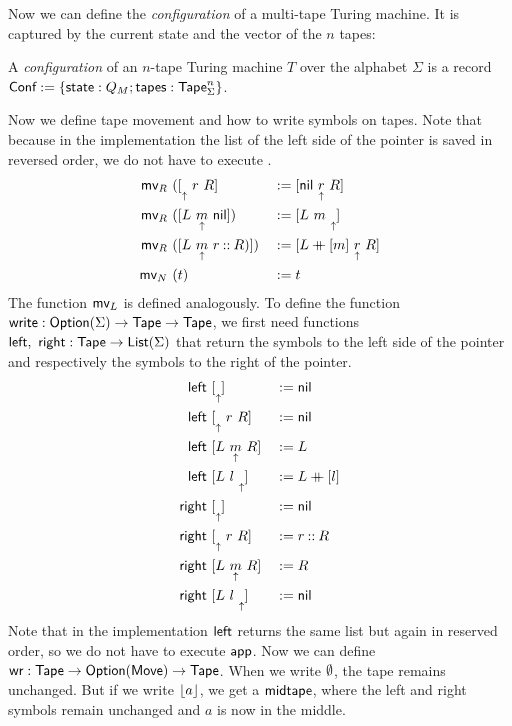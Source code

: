 \documentclass{psartcl}
\begin{document}
Now we can define the \emph{configuration} of a multi-tape Turing machine.  It is captured by the current state and the vector of the $n$ tapes:
\begin{definition}[Configuration]
  \label{def:config}
  A \emph{configuration} of an $n$-tape Turing machine $T$ over the alphabet $\Sigma$ is a record $\textsf{Conf} := \{\textsf{state}:Q_M; \textsf{tapes}:\textsf{Tape}_\Sigma^n\}$.
\end{definition}

Now we define tape movement and how to write symbols on tapes.  Note that because in the implementation the list of the left side of the pointer is
saved in reversed order, we do not have to execute .  \begin{alignat*}{2}
  \textsf{mv}_R&~([ \underset{\uparrow}{}~r~R ]               &&:= [ \textsf{nil}~\underset{\uparrow}{r}~R ] \\
  \textsf{mv}_R&~([ L~\underset{\uparrow}{m}~\textsf{nil} ])       &&:= [ L~m~\underset{\uparrow}{} ] \\
  \textsf{mv}_R&~([ L~\underset{\uparrow}{m}~r \mathbin{::} R) ]) &&:= [ L \mathbin{+\mkern-10mu+} [m]~\underset{\uparrow}{r}~R ] \\
  \textsf{mv}_N&~(t)                          &&:= t
\end{alignat*}
The function $\textsf{mv}_L$ is defined analogously.
To define the function $\textsf{write} : \textsf{Option}(\Sigma) \rightarrow \textsf{Tape} \rightarrow \textsf{Tape}$, we first need functions
$\textsf{left},~\textsf{right} : \textsf{Tape} \rightarrow \textsf{List}(\Sigma)$
that return the symbols to the left side of the pointer and respectively the symbols to the right of the pointer.
\begin{alignat*}{2}
  \textsf{left} &~[ \underset{\uparrow}{} ]          &&:= \textsf{nil} \\
  \textsf{left} &~[ \underset{\uparrow}{}~r~R ]     &&:= \textsf{nil} \\
  \textsf{left} &~[ L~\underset{\uparrow}{m}~R ] &&:= L \\
  \textsf{left} &~[ L~l~\underset{\uparrow}{} ]    &&:= L \mathbin{+\mkern-10mu+} [l] \\
  \textsf{right}&~[ \underset{\uparrow}{} ]          &&:= \textsf{nil} \\
  \textsf{right}&~[ \underset{\uparrow}{}~r~R ]     &&:= r \mathbin{::} R \\
  \textsf{right}&~[ L~\underset{\uparrow}{m}~R ] &&:= R \\
  \textsf{right}&~[ L~l~\underset{\uparrow}{} ]    &&:= \textsf{nil}
\end{alignat*}
Note that in the implementation $\textsf{left}$ returns the same list but again in reserved order, so we do not have to execute $\textsf{app}$.
Now we can define $\textsf{wr} : \textsf{Tape} \rightarrow \textsf{Option}(\textsf{Move}) \rightarrow \textsf{Tape}$.
When we write $\emptyset$, the tape remains unchanged.
But if we write $\left\lfloor {a}\right\rfloor$, we get a $\textsf{midtape}$, where the left and right symbols remain unchanged and $a$ is now in the middle.
\end{document}
